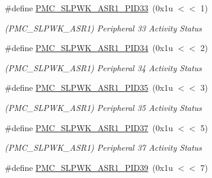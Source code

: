 \begin{DoxyCompactItemize}
\mbox{\label{group__SAMV71__PMC_gaab6384d4de4c6b740e9b296fcf8a9843}} 
\#define \mbox{\hyperlink{group__SAMV71__PMC_gaab6384d4de4c6b740e9b296fcf8a9843}{P\+M\+C\+\_\+\+S\+L\+P\+W\+K\+\_\+\+A\+S\+R1\+\_\+\+P\+I\+D33}}~(0x1u $<$$<$ 1)
\begin{DoxyCompactList}\small\item\em (P\+M\+C\+\_\+\+S\+L\+P\+W\+K\+\_\+\+A\+S\+R1) Peripheral 33 Activity Status \end{DoxyCompactList}\item 
\mbox{\label{group__SAMV71__PMC_ga90ef4c6d673fd5ed2b74616a0490df94}} 
\#define \mbox{\hyperlink{group__SAMV71__PMC_ga90ef4c6d673fd5ed2b74616a0490df94}{P\+M\+C\+\_\+\+S\+L\+P\+W\+K\+\_\+\+A\+S\+R1\+\_\+\+P\+I\+D34}}~(0x1u $<$$<$ 2)
\begin{DoxyCompactList}\small\item\em (P\+M\+C\+\_\+\+S\+L\+P\+W\+K\+\_\+\+A\+S\+R1) Peripheral 34 Activity Status \end{DoxyCompactList}\item 
\mbox{\label{group__SAMV71__PMC_ga9dc24631242c68111df9bb4e8b075060}} 
\#define \mbox{\hyperlink{group__SAMV71__PMC_ga9dc24631242c68111df9bb4e8b075060}{P\+M\+C\+\_\+\+S\+L\+P\+W\+K\+\_\+\+A\+S\+R1\+\_\+\+P\+I\+D35}}~(0x1u $<$$<$ 3)
\begin{DoxyCompactList}\small\item\em (P\+M\+C\+\_\+\+S\+L\+P\+W\+K\+\_\+\+A\+S\+R1) Peripheral 35 Activity Status \end{DoxyCompactList}\item 
\mbox{\label{group__SAMV71__PMC_gad32f9c6f78963b498f7d6c8105d86f5e}} 
\#define \mbox{\hyperlink{group__SAMV71__PMC_gad32f9c6f78963b498f7d6c8105d86f5e}{P\+M\+C\+\_\+\+S\+L\+P\+W\+K\+\_\+\+A\+S\+R1\+\_\+\+P\+I\+D37}}~(0x1u $<$$<$ 5)
\begin{DoxyCompactList}\small\item\em (P\+M\+C\+\_\+\+S\+L\+P\+W\+K\+\_\+\+A\+S\+R1) Peripheral 37 Activity Status \end{DoxyCompactList}\item 
\mbox{\label{group__SAMV71__PMC_ga17d9236f48a1f6ee42bc8287a286c525}} 
\#define \mbox{\hyperlink{group__SAMV71__PMC_ga17d9236f48a1f6ee42bc8287a286c525}{P\+M\+C\+\_\+\+S\+L\+P\+W\+K\+\_\+\+A\+S\+R1\+\_\+\+P\+I\+D39}}~(0x1u $<$$<$ 7)
$$
\end{DoxyCompactItemize}
